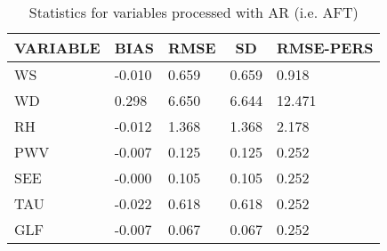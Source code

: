 \begin{table}[]
\begin{center}
\begin{tabular}{|l|l|l|l|l|}
\hline
\multicolumn{1}{c|}{\cellcolor[HTML]{C0C0C0}\textbf{VARIABLE}} & \multicolumn{1}{c|}{\cellcolor[HTML]{C0C0C0}\textbf{BIAS}} & \multicolumn{1}{c|}{\cellcolor[HTML]{C0C0C0}\textbf{RMSE}} & \multicolumn{1}{c|}{\cellcolor[HTML]{C0C0C0}\textbf{SD}} & \multicolumn{1}{c|}{\cellcolor[HTML]{C0C0C0}\textbf{RMSE-PERS}}\\\hline
\cellcolor[HTML]{C0C0C0}WS  &    -0.010                                &     0.659                                &     0.659  &     0.918 \\
\cellcolor[HTML]{C0C0C0}WD  &     0.298                                &     6.650                                &     6.644  &    12.471 \\
\cellcolor[HTML]{C0C0C0}RH  &    -0.012                                &     1.368                                &     1.368  &     2.178 \\
\cellcolor[HTML]{C0C0C0}PWV &    -0.007                               &     0.125                               &     0.125 &     0.252 \\
\cellcolor[HTML]{C0C0C0}SEE &    -0.000                               &     0.105                               &     0.105 &     0.252 \\
\cellcolor[HTML]{C0C0C0}TAU &    -0.022                               &     0.618                               &     0.618 &     0.252 \\
\cellcolor[HTML]{C0C0C0}GLF &    -0.007                               &     0.067                               &     0.067 &     0.252 \\
\hline
\end{tabular}
\caption{Statistics for variables processed with AR (i.e. AFT)}
\end{center}
\end{table}
